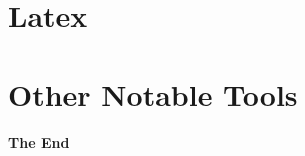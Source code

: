 \documentclass[aspectratio=169,xcolor=dvipsnames,svgnames,x11names,fleqn]{beamer}
\begin{document}
\begin{frame}
    \sectionpage
\end{frame}

\section{Latex}

\begin{frame}
    \sectionpage
\end{frame}

\section{Other Notable Tools}

\begin{frame}
    \sectionpage
\end{frame}

\begin{frame}
    \Huge{\centerline{\color{bubblegumPink}\textbf{The End}}}
\end{frame}
\end{document}
